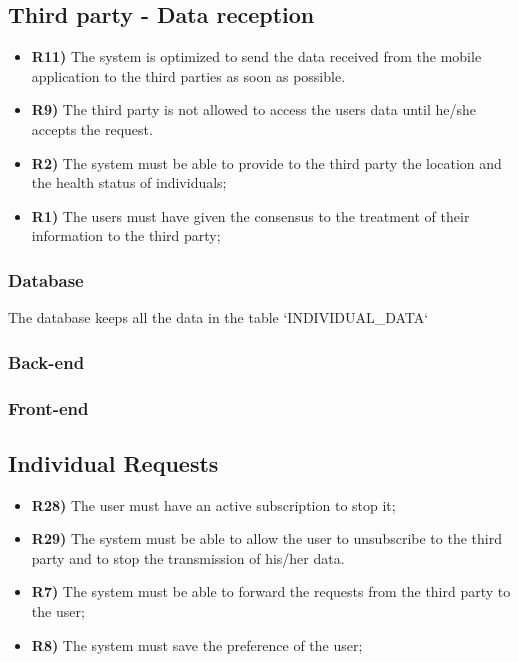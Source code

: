\subsection{Third party - Data reception}
\begin{itemize}	
	\item {\color{Green}\textbf{R11)}} The system is optimized to send the data received from the mobile application to the third parties as soon as possible.
	\item {\color{Green}\textbf{R9)}} The third party is not allowed to access the users data until he/she accepts the request.
	\item {\color{Green}\textbf{R2)}} The system must be able to provide to the third party the location and the health status of individuals;
	\item {\color{Green}\textbf{R1)}} The users must have given the consensus to the treatment of their information to the third party;
\end{itemize}

\subsubsection*{Database}
The database keeps all the data in the table `INDIVIDUAL_DATA`


\subsubsection*{Back-end}


\subsubsection*{Front-end}

\subsection{Individual Requests}
\begin{itemize}	
	\item {\color{Green}\textbf{R28)}} The user must have an active subscription to stop it;
	\item {\color{Green}\textbf{R29)}} The system must be able to allow the user to unsubscribe to the third party and to stop the transmission of his/her data.
	\item {\color{Green}\textbf{R7)}} The system must be able to forward the requests from the third party to the user;
	\item {\color{Green}\textbf{R8)}} The system must save the preference of the user;	
\end{itemize}

